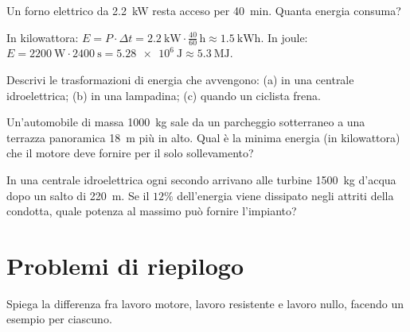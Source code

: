 \begin{testexample}
Un forno elettrico da \SI{2,2}{\kilo\watt} resta acceso per \SI{40}{\minute}. Quanta energia consuma?

In kilowattora: $E = P \cdot \Delta t = \SI{2,2}{\kilo\watt} \cdot \tfrac{40}{60}\,\si{\hour} \approx \SI{1,5}{\kilo\watt\hour}$.
In joule: $E = \SI{2200}{\watt} \cdot \SI{2400}{\second} = \SI{5,28e6}{\joule} \approx \SI{5,3}{\mega\joule}$.
\end{testexample}

\begin{esercizio}
Descrivi le trasformazioni di energia che avvengono: (a) in una centrale idroelettrica; (b) in una lampadina; (c) quando un ciclista frena.\\
\end{esercizio}

\begin{esercizio}
Un'automobile di massa \SI{1000}{\kilo\gram} sale da un parcheggio sotterraneo a una terrazza panoramica \SI{18}{\metre} più in alto. Qual è la minima energia (in kilowattora) che il motore deve fornire per il solo sollevamento?\\
\end{esercizio}

\begin{esercizio}
In una centrale idroelettrica ogni secondo arrivano alle turbine \SI{1500}{\kilo\gram} d'acqua dopo un salto di \SI{220}{\metre}. Se il $12\%$ dell'energia viene dissipato negli attriti della condotta, quale potenza al massimo può fornire l'impianto?\\
\end{esercizio}

\section{Problemi di riepilogo}

\begin{esercizio}
Spiega la differenza fra lavoro motore, lavoro resistente e lavoro nullo, facendo un esempio per ciascuno.\\
\end{esercizio}


